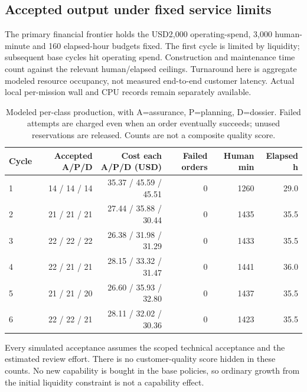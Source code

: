 \subsection{Accepted output under fixed service limits}
The primary financial frontier holds the USD2,000 operating-spend, 3,000 human-minute and 160 elapsed-hour budgets fixed. The first cycle is limited by liquidity; subsequent base cycles hit operating spend. Construction and maintenance time count against the relevant human/elapsed ceilings. Turnaround here is aggregate modeled resource occupancy, not measured end-to-end customer latency. Actual local per-mission wall and CPU records remain separately available.
\begin{table}[H]\small\centering\begin{tabular}{lrrrrr}\toprule
Cycle & Accepted A/P/D & Cost each A/P/D (USD) & Failed orders & Human min & Elapsed h \\\midrule
1 & 14 / 14 / 14 & 35.37 / 45.59 / 45.51 & 0 & 1260 & 29.0 \\
2 & 21 / 21 / 21 & 27.44 / 35.88 / 30.44 & 0 & 1435 & 35.5 \\
3 & 22 / 22 / 22 & 26.38 / 31.98 / 31.29 & 0 & 1433 & 35.5 \\
4 & 22 / 21 / 21 & 28.15 / 33.32 / 31.47 & 0 & 1441 & 36.0 \\
5 & 21 / 21 / 20 & 26.60 / 35.93 / 32.80 & 0 & 1437 & 35.5 \\
6 & 22 / 22 / 21 & 28.11 / 32.02 / 30.36 & 0 & 1423 & 35.5 \\
\bottomrule\end{tabular}\caption{Modeled per-class production, with A=assurance, P=planning, D=dossier. Failed attempts are charged even when an order eventually succeeds; unused reservations are released. Counts are not a composite quality score.}\end{table}
Every simulated acceptance assumes the scoped technical acceptance and the estimated review effort. There is no customer-quality score hidden in these counts. No new capability is bought in the base policies, so ordinary growth from the initial liquidity constraint is not a capability effect.

